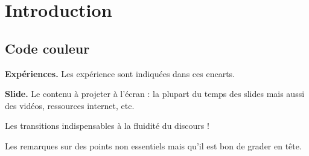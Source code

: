 \chapter*{Introduction}

\section*{Code couleur}

\begin{experience}
\textbf{Expériences.}
Les expérience sont indiquées dans ces encarts.
\end{experience}

\begin{slide}
\textbf{Slide.}
Le contenu à projeter à l'écran : la plupart du temps des slides mais aussi des vidéos, ressources internet, etc.
\end{slide}

\begin{transition}
Les transitions indispensables à la fluidité du discours !
\end{transition}

\begin{remarque}
Les remarques sur des points non essentiels mais qu'il est bon de grader en tête.
\end{remarque}